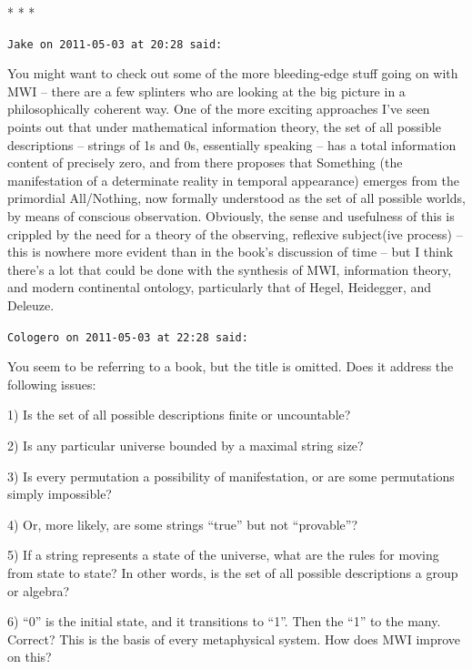 
\begin{center}* * *\end{center}

\begin{footnotesize}
\begin{sffamily}
\texttt{Jake on 2011-05-03 at 20:28 said:}

You might want to check out some of the more bleeding-edge stuff going on with MWI -- there are a few splinters who are looking at the big picture in a philosophically coherent way. One of the more exciting approaches I've seen points out that under mathematical information theory, the set of all possible descriptions -- strings of 1s and 0s, essentially speaking -- has a total information content of precisely zero, and from there proposes that Something (the manifestation of a determinate reality in temporal appearance) emerges from the primordial All/Nothing, now formally understood as the set of all possible worlds, by means of conscious observation. Obviously, the sense and usefulness of this is crippled by the need for a theory of the observing, reflexive subject(ive process) -- this is nowhere more evident than in the book's discussion of time -- but I think there's a lot that could be done with the synthesis of MWI, information theory, and modern continental ontology, particularly that of Hegel, Heidegger, and Deleuze.

\hfill

\texttt{Cologero on 2011-05-03 at 22:28 said:}

You seem to be referring to a book, but the title is omitted. Does it address the following issues:

1) Is the set of all possible descriptions finite or uncountable?

2) Is any particular universe bounded by a maximal string size?

3) Is every permutation a possibility of manifestation, or are some permutations simply impossible?

4) Or, more likely, are some strings ``true'' but not ``provable''?

5) If a string represents a state of the universe, what are the rules for moving from state to state? In other words, is the set of all possible descriptions a group or algebra?

6) ``0'' is the initial state, and it transitions to ``1''. Then the ``1'' to the many. Correct? This is the basis of every metaphysical system. How does MWI improve on this?


\end{sffamily}
\end{footnotesize}
